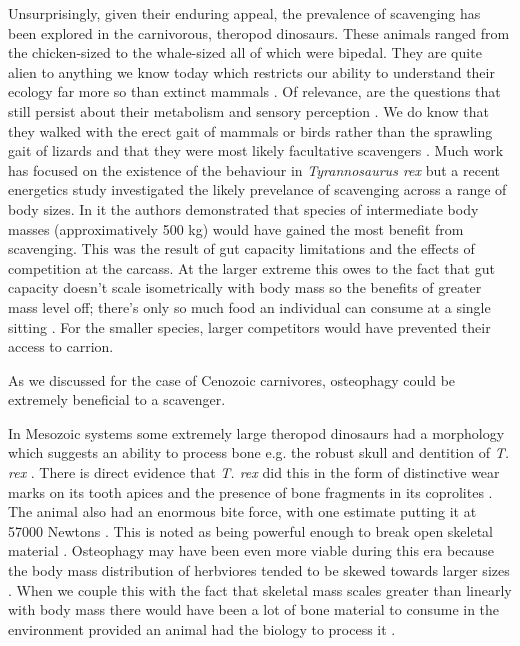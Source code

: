 \documentclass[a4paper,12pt]{article}
\begin{document}
Unsurprisingly, given their enduring appeal, the prevalence of scavenging has been explored in the carnivorous, theropod dinosaurs.
These animals ranged from the chicken-sized to the whale-sized all of which were bipedal.
They are quite alien to anything we know today which restricts our ability to understand their ecology far more so than extinct mammals \citep{weishampel2004dinosauria}.
Of relevance, are the questions that still persist about their metabolism \citep{grady2014evidence} and sensory perception \citep{farlow1994speculations}.
We do know that they walked with the erect gait of mammals or birds rather than the sprawling gait of lizards and that they were most likely facultative scavengers \citep{weishampel2004dinosauria,depalma2013physical}.
Much work has focused on the existence of the behaviour in \textit{Tyrannosaurus rex} \citep{ruxton2003could,carbone2011intra} but a recent energetics study investigated the likely prevelance of scavenging across a range of body sizes.
In it the authors demonstrated that species of intermediate body masses (approximatively 500 kg) would have gained the most benefit from scavenging.
This was the result of gut capacity limitations and the effects of competition at the carcass.
At the larger extreme this owes to the fact that gut capacity doesn't scale isometrically with body mass so the benefits of greater mass level off; there's only so much food an individual can consume at a single sitting \citep{calder1996size}.
For the smaller species, larger competitors would have prevented their access to carrion.


As we discussed for the case of Cenozoic carnivores, osteophagy could be extremely beneficial to a scavenger.

In Mesozoic systems some extremely large theropod dinosaurs had a morphology which suggests an ability to process bone e.g. the robust skull and dentition of \textit{T. rex} \citep{hone2010feeding}.
There is direct evidence that \textit{T. rex} did this in the form of distinctive wear marks on its tooth apices \citep{farlow1994wear,schubert2005wear} and the presence of bone fragments in its coprolites \citep{chin1998king}.
The animal also had an enormous bite force, with one estimate putting it at 57000 Newtons \citep{bates2012estimating}.
This is noted as being powerful enough to break open skeletal material \citep{rayfield2001cranial}.
Osteophagy may have been even more viable during this era because the body mass distribution of herbviores tended to be skewed towards larger sizes \citep{10.1371/journal.pone.0051925}.
When we couple this with the fact that skeletal mass scales greater than linearly with body mass \citep{prange1979scaling} there would have been a lot of bone material to consume in the environment provided an animal had the biology to process it \citep{chure1997one}.
\end{document}
